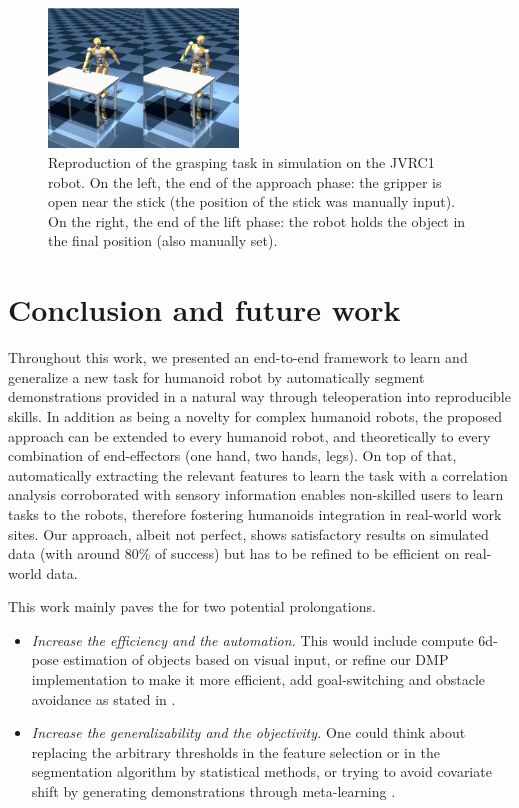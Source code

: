 \documentclass[conference]{IEEEtran}
\begin{document}
\begin{figure}[t]
  \centering
  \includegraphics[width=0.45\textwidth]{img/Reproduction.png}
  \caption{Reproduction of the grasping task in simulation on the JVRC1 robot. On the left, the end of the approach phase: the gripper is open near the stick (the position of the stick was manually input). On the right, the end of the lift phase: the robot holds the object in the final position (also manually set).}
  \label{fig:reproductionSim}
\end{figure}

\section{Conclusion and future work}\label{conclusion}

Throughout this work, we presented an end-to-end framework to learn and generalize a new task for humanoid robot by automatically segment demonstrations provided in a natural way through teleoperation into reproducible skills. In addition as being a novelty for complex humanoid robots, the proposed approach can be extended to every humanoid robot, and theoretically to every combination of end-effectors (one hand, two hands, legs). On top of that, automatically extracting the relevant features to learn the task with a correlation analysis corroborated with sensory information enables non-skilled users to learn tasks to the robots, therefore fostering humanoids integration in real-world work sites. Our approach, albeit not perfect, shows satisfactory results on simulated data (with around 80\% of success) but has to be refined to be efficient on real-world data. \newline


This work mainly paves the for two potential prolongations.
\begin{itemize}
    \item \textit{Increase the efficiency and the automation.} This would include compute 6d-pose estimation of objects based on visual input, or refine our DMP implementation to make it more efficient, add goal-switching and obstacle avoidance as stated in \cite{saveriano_dynamic_2021}. 
    
    \item  \textit{Increase the generalizability and the objectivity.} One could think about replacing the arbitrary thresholds in the feature selection or in the segmentation algorithm by statistical methods, or trying to avoid covariate shift by generating demonstrations through meta-learning \cite{yu_one-shot_2018}.

\end{itemize}




\vspace{12pt}
\end{document}
